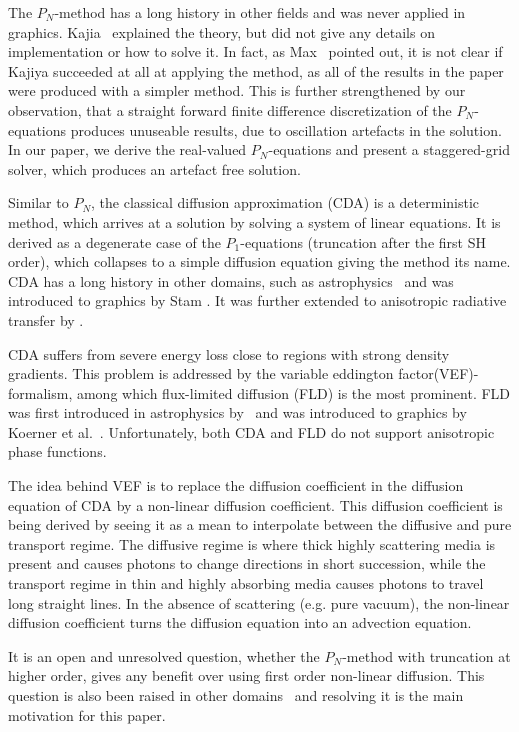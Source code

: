 The $P_N$-method has a long history in other fields and was never applied in graphics. Kajia~\cite{Kajiya84} explained the theory, but did not give any details on implementation or how to solve it. In fact, as Max~\cite{Max95} pointed out, it is not clear if Kajiya succeeded at all at applying the method, as all of the results in the paper were produced with a simpler method. This is further strengthened by our observation, that a straight forward finite difference discretization of the $P_N$-equations produces unuseable results, due to oscillation artefacts in the solution. In our paper, we derive the real-valued $P_N$-equations and present a staggered-grid solver, which produces an artefact free solution.

Similar to $P_N$, the classical diffusion approximation (CDA) is a deterministic method, which arrives at a solution by solving a system of linear equations. It is derived as a degenerate case of the $P_1$-equations (truncation after the first SH order), which collapses to a simple diffusion equation giving the method its name. CDA has a long history in other domains, such as astrophysics~\cite{Ishimaru78} and was introduced to graphics by Stam \cite{Stam95}. It was further extended to anisotropic radiative transfer by \cite{Jakob10}.

CDA suffers from severe energy loss close to regions with strong density gradients. This problem is addressed by the variable eddington factor(VEF)-formalism, among which flux-limited diffusion (FLD) is the most prominent. FLD was first introduced in astrophysics by~\cite{Pomraining78} and was introduced to graphics by Koerner et al.~\cite{Koerner14}. Unfortunately, both CDA and FLD do not support anisotropic phase functions.

The idea behind VEF is to replace the diffusion coefficient in the diffusion equation of CDA by a non-linear diffusion coefficient. This diffusion coefficient is being derived by seeing it as a mean to interpolate between the diffusive and pure transport regime. The diffusive regime is where thick highly scattering media is present and causes photons to change directions in short succession, while the transport regime in thin and highly absorbing media causes photons to travel long straight lines. In the absence of scattering (e.g. pure vacuum), the non-linear diffusion coefficient turns the diffusion equation into an advection equation.

It is an open and unresolved question, whether the $P_N$-method with truncation at higher order, gives any benefit over using first order non-linear diffusion. This question is also been raised in other domains~\cite{Olson00} and resolving it is the main motivation for this paper.
 
